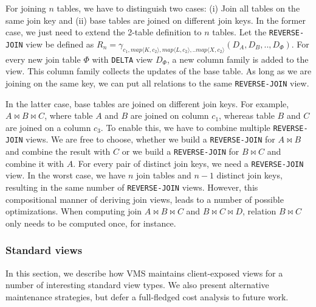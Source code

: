 For joining $n$ tables, we have to distinguish two cases: (i) Join all
tables on the same join key and (ii) base tables are joined on
different join keys.  In the former case, we just need to extend the
2-table definition to $n$ tables. Let the \texttt{REVERSE-JOIN} view
be defined as $R_n=\gamma_{c_1,
  map\langle K,c_2\rangle, map\langle L,c_2 \rangle,..map\langle X,c_2\rangle}(D_A,D_B,..,
D_{\Phi})$. For every new join table $\Phi$ with \texttt{DELTA} view
$D_{\Phi}$, a new column family is added to the view. This column
family collects the updates of the base table.  As long as we are
joining on the same key, we can put all relations to the same
\texttt{REVERSE-JOIN} view.

In the latter case, base tables are joined on different join keys. For
example, $A \bowtie B \bowtie C$, where table $A$ and $B$ are joined
on column $c_1$, whereas table $B$ and $C$ are joined on a column
$c_3$.  To enable this, we have to combine multiple
\texttt{REVERSE-JOIN} views. We are free to choose, whether we build a
\texttt{REVERSE-JOIN} for $A \bowtie B$ and combine the result with
$C$ or we build a \texttt{REVERSE-JOIN} for $B \bowtie C$ and combine
it with $A$. For every pair of distinct join keys, we need a
\texttt{REVERSE-JOIN} view.  In the worst case, we have $n$ join
tables and $n-1$ distinct join keys, resulting in the same number of
\texttt{REVERSE-JOIN} views.  However, this compositional manner of
deriving join views, leads to a number of possible optimizations. When
computing join $A \bowtie B \bowtie C$ and $B \bowtie C \bowtie D$,
relation $B \bowtie C$ only needs to be computed once, for instance.



\subsubsection{Standard views}
\label{subsec:common_views}

In this section, we describe how VMS maintains client-exposed views
for a number of interesting standard view types. We also present
alternative maintenance strategies, but defer a full-fledged cost
analysis to future work.

